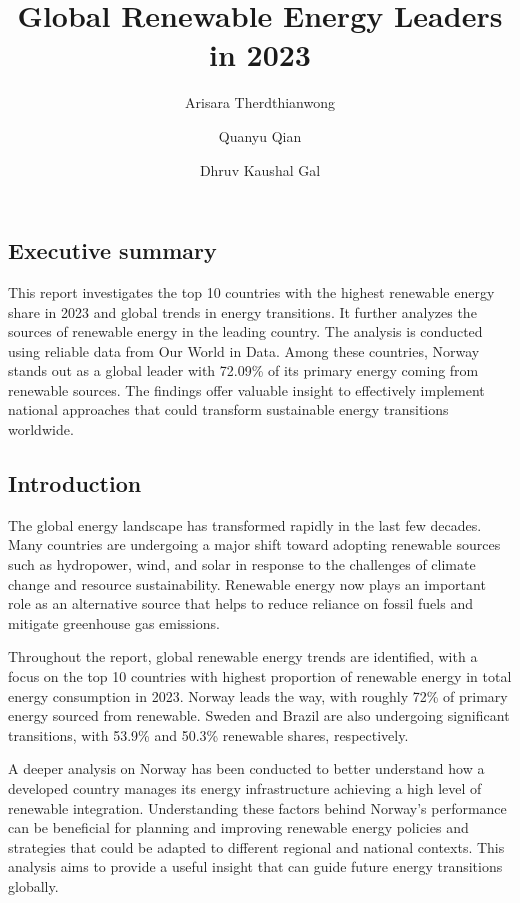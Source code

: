 \documentclass[
  letterpaper,
  DIV=11,
  numbers=noendperiod]{scrartcl}
\title{Global Renewable Energy Leaders in 2023}
\author{Arisara Therdthianwong \and Quanyu Qian \and Dhruv Kaushal Gal}
\date{}
\renewcommand*\contentsname{Table of contents}
\newcommand\contentsname{Table of contents}
\begin{document}
\maketitle

\renewcommand*\contentsname{Table of Contents}
{
\hypersetup{linkcolor=}
\setcounter{tocdepth}{3}
\tableofcontents
}

\subsection{Executive summary}\label{executive-summary}

This report investigates the top 10 countries with the highest renewable
energy share in 2023 and global trends in energy transitions. It further
analyzes the sources of renewable energy in the leading country. The
analysis is conducted using reliable data from Our World in Data. Among
these countries, Norway stands out as a global leader with 72.09\% of
its primary energy coming from renewable sources. The findings offer
valuable insight to effectively implement national approaches that could
transform sustainable energy transitions worldwide.

\newpage

\subsection{Introduction}\label{introduction}

The global energy landscape has transformed rapidly in the last few
decades. Many countries are undergoing a major shift toward adopting
renewable sources such as hydropower, wind, and solar in response to the
challenges of climate change and resource sustainability. Renewable
energy now plays an important role as an alternative source that helps
to reduce reliance on fossil fuels and mitigate greenhouse gas
emissions.

Throughout the report, global renewable energy trends are identified,
with a focus on the top 10 countries with highest proportion of
renewable energy in total energy consumption in 2023. Norway leads the
way, with roughly 72\% of primary energy sourced from renewable. Sweden
and Brazil are also undergoing significant transitions, with 53.9\% and
50.3\% renewable shares, respectively.

A deeper analysis on Norway has been conducted to better understand how
a developed country manages its energy infrastructure achieving a high
level of renewable integration. Understanding these factors behind
Norway's performance can be beneficial for planning and improving
renewable energy policies and strategies that could be adapted to
different regional and national contexts. This analysis aims to provide
a useful insight that can guide future energy transitions globally.
\end{document}
